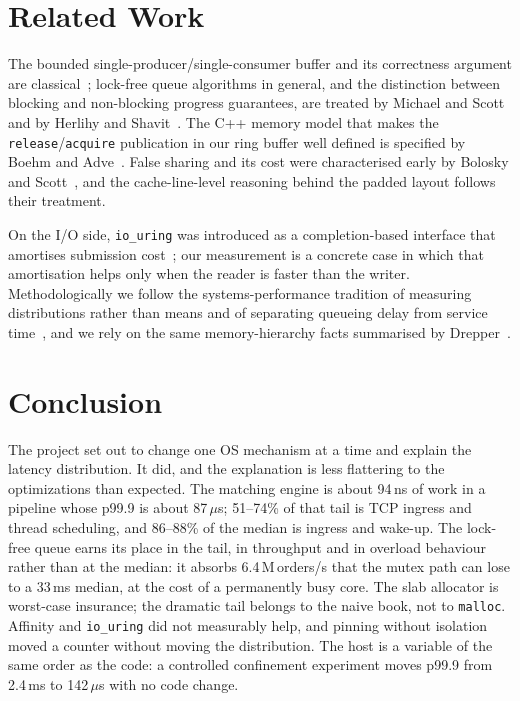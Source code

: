 \documentclass[conference]{IEEEtran}
\newcommand{\us}{\,$\mu$s}
\newcommand{\ns}{\,ns}
\newcommand{\Mops}{\,M\,orders/s}
\begin{document}
\section{Related Work}

The bounded single-producer/single-consumer buffer and its correctness argument
are classical~\cite{lamport}; lock-free queue algorithms in general, and the
distinction between blocking and non-blocking progress guarantees, are treated by
Michael and Scott~\cite{michael} and by Herlihy and Shavit~\cite{herlihy}. The
C++ memory model that makes the \texttt{release}/\texttt{acquire} publication in
our ring buffer well defined is specified by Boehm and Adve~\cite{boehm}. False
sharing and its cost were characterised early by Bolosky and
Scott~\cite{bolosky}, and the cache-line-level reasoning behind the padded layout
follows their treatment.

On the I/O side, \texttt{io\_uring} was introduced as a completion-based
interface that amortises submission cost~\cite{axboe}; our measurement is a
concrete case in which that amortisation helps only when the reader is faster
than the writer. Methodologically we follow the systems-performance tradition of
measuring distributions rather than means and of separating queueing delay from
service time~\cite{gregg}, and we rely on the same memory-hierarchy facts
summarised by Drepper~\cite{drepper}.

\section{Conclusion}

The project set out to change one OS mechanism at a time and explain the latency
distribution. It did, and the explanation is less flattering to the
optimizations than expected. The matching engine is about 94\ns{} of work in a
pipeline whose p99.9 is about 87\us; 51--74\% of that tail is TCP ingress and
thread scheduling, and 86--88\% of the median is ingress and wake-up. The
lock-free queue earns its place in the tail, in throughput and in overload
behaviour rather than at the median: it absorbs 6.4\Mops{} that the mutex path
can lose to a 33\,ms median, at the cost of a permanently busy core. The slab
allocator is worst-case insurance; the dramatic tail belongs to the naive book,
not to \texttt{malloc}. Affinity and \texttt{io\_uring} did not measurably help,
and pinning without isolation moved a counter without moving the distribution.
The host is a variable of the same order as the code: a controlled confinement
experiment moves p99.9 from 2.4\,ms to 142\us{} with no code change.
\end{document}

